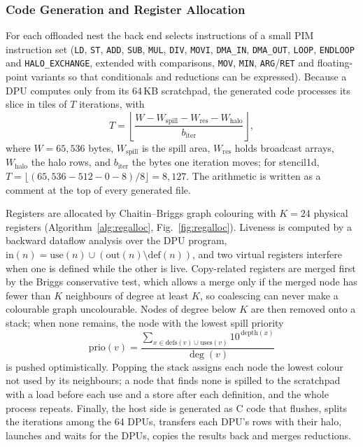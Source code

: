 \documentclass{ieeeaccess}
\begin{document}
\subsubsection{Code Generation and Register Allocation}
For each offloaded nest the back end selects instructions of a small PIM instruction set (\texttt{LD}, \texttt{ST}, \texttt{ADD}, \texttt{SUB}, \texttt{MUL}, \texttt{DIV}, \texttt{MOVI}, \texttt{DMA\_IN}, \texttt{DMA\_OUT}, \texttt{LOOP}, \texttt{ENDLOOP} and \texttt{HALO\_EXCHANGE}, extended with comparisons, \texttt{MOV}, \texttt{MIN}, \texttt{ARG}/\texttt{RET} and floating-point variants so that conditionals and reductions can be expressed). Because a DPU computes only from its 64\,KB scratchpad, the generated code processes its slice in tiles of $T$ iterations, with
\begin{equation}
T = \left\lfloor \frac{W - W_{\mathrm{spill}} - W_{\mathrm{res}} - W_{\mathrm{halo}}}{b_{\mathrm{iter}}} \right\rfloor,
\label{eq:tile}
\end{equation}
where $W=65{,}536$ bytes, $W_{\mathrm{spill}}$ is the spill area, $W_{\mathrm{res}}$ holds broadcast arrays, $W_{\mathrm{halo}}$ the halo rows, and $b_{\mathrm{iter}}$ the bytes one iteration moves; for stencil1d, $T=\lfloor(65{,}536-512-0-8)/8\rfloor=8{,}127$. The arithmetic is written as a comment at the top of every generated file.

Registers are allocated by Chaitin--Briggs graph colouring with $K=24$ physical registers (Algorithm~\ref{alg:regalloc}, Fig.~\ref{fig:regalloc}). Liveness is computed by a backward dataflow analysis over the DPU program, $\mathrm{in}(n)=\mathrm{use}(n)\cup(\mathrm{out}(n)\setminus\mathrm{def}(n))$, and two virtual registers interfere when one is defined while the other is live. Copy-related registers are merged first by the Briggs conservative test, which allows a merge only if the merged node has fewer than $K$ neighbours of degree at least $K$, so coalescing can never make a colourable graph uncolourable. Nodes of degree below $K$ are then removed onto a stack; when none remains, the node with the lowest spill priority
\begin{equation}
\mathrm{prio}(v) = \frac{\sum_{x\in \mathrm{defs}(v)\cup\mathrm{uses}(v)} 10^{\,\mathrm{depth}(x)}}{\deg(v)}
\label{eq:spill}
\end{equation}
is pushed optimistically. Popping the stack assigns each node the lowest colour not used by its neighbours; a node that finds none is spilled to the scratchpad with a load before each use and a store after each definition, and the whole process repeats. Finally, the host side is generated as C code that flushes, splits the iterations among the 64 DPUs, transfers each DPU's rows with their halo, launches and waits for the DPUs, copies the results back and merges reductions.
\end{document}
